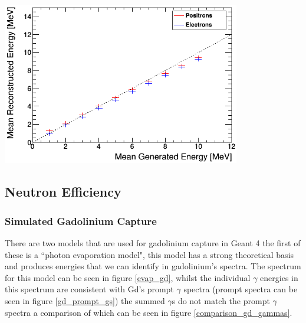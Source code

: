 \documentclass[12pt,a4paper]{article}
\newenvironment{Figure}
  {\par\medskip\noindent\minipage{\linewidth}}
  {\endminipage\par\medskip}
\begin{document}
\begin{Figure}
 \centering
 \includegraphics[height=71mm]{Recon_vs_gen_e-_e+.png}
 \label{Recon_gen_ele_pos}
\end{Figure} 

\subsection{Neutron Efficiency}
\subsubsection{Simulated Gadolinium Capture}
There are two models that are used for gadolinium capture in Geant 4 the first of these is a ``photon evaporation model", this model has a strong theoretical basis and produces energies that we can identify in gadolinium's spectra. The spectrum for this model can be seen in figure \ref{evap_gd}, whilst the individual $\gamma$ energies in this spectrum are consistent with Gd's prompt $\gamma$ spectra (prompt spectra can be seen in figure \ref{gd_prompt_gs}) the summed $\gamma$s do not match the prompt $\gamma$ spectra a comparison of which can be seen in figure \ref{comparison_gd_gammas}. 
\end{document}
